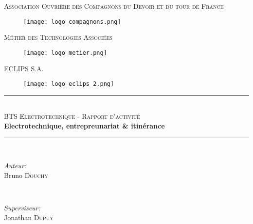 \documentclass[a4paper, 12pt]{article}
\begin{document}
 
\begin{titlepage}

\newcommand{\HRule}{\rule{\linewidth}{0.5mm}}

\center 
 
\huge\textsc{\Large Association Ouvrière des Compagnons du Devoir et du tour de France}\\

 \begin{figure}[h]
\texttt{[image: logo\_compagnons.png]}
\centering
\end{figure}

\textsc{\Large Métier des Technologies Associées}\\

 \begin{figure}[h]
\texttt{[image: logo\_metier.png]}
\centering
 \end{figure}

\textsc{\large ECLIPS S.A.}\\

\begin{figure}[h]
\texttt{[image: logo\_eclips\_2.png]}
\centering
\end{figure}

\HRule \\[0.4cm]
\huge\textsc{\LARGE BTS Electrotechnique - Rapport d'activité}\\
{ \huge \bfseries Electrotechnique, entrepreunariat \& itinérance}\\[0.4cm]
\HRule \\

\vfill

\begin{minipage}{0.4\textwidth}
\begin{flushleft} \large
\emph{Auteur:}\\
Bruno \textsc{Douchy}
\end{flushleft}
\end{minipage}
~
\begin{minipage}{0.4\textwidth}
\begin{flushright} \large
\emph{Superviseur:} \\
Jonathan \textsc{Dupuy}
\end{flushright}
\end{minipage}\\

\vfill

\end{titlepage}

\newpage
\end{document}
